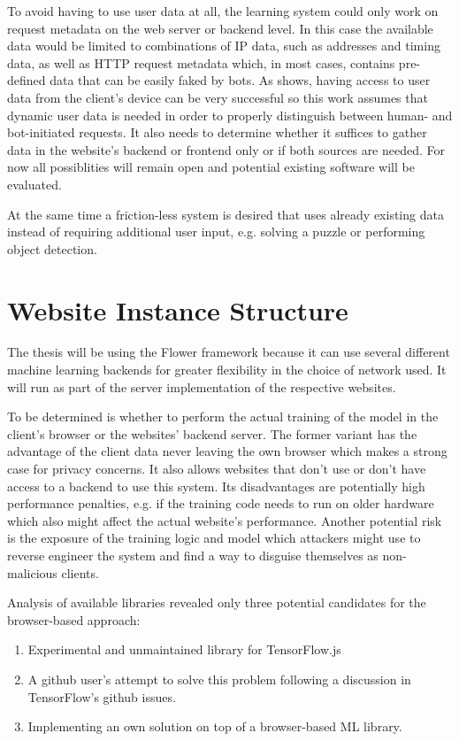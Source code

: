 \documentclass[
    fontsize=12pt,
    headings=small,
    parskip=half,           %
    bibliography=totoc,
    numbers=noenddot,       %
    open=any,               %
    ]{scrreprt}
\begin{document}
To avoid having to use user data at all, the learning system could only work on request metadata on the web server or backend level. In this case the available data would be limited to combinations of IP data, such as addresses and timing data, as well as HTTP request metadata which, in most cases, contains pre-defined data that can be easily faked by bots. As \cite{PETS2021} shows, having access to user data from the client's device can be very successful so this work assumes that dynamic user data is needed in order to properly distinguish between human- and bot-initiated requests. It also needs to determine whether it suffices to gather data in the website's backend or frontend only or if both sources are needed. For now all possiblities will remain open and potential existing software will be evaluated.

At the same time a friction-less system is desired that uses already existing data instead of requiring additional user input, e.g. solving a puzzle or performing object detection.

\section{Website Instance Structure}

The thesis will be using the Flower framework because it can use several different machine learning backends for greater flexibility in the choice of network used. It will run as part of the server implementation of the respective websites.

To be determined is whether to perform the actual training of the model in the client's browser or the websites' backend server. The former variant has the advantage of the client data never leaving the own browser which makes a strong case for privacy concerns. It also allows websites that don't use or don't have access to a backend to use this system. Its disadvantages are potentially high performance penalties, e.g. if the training code needs to run on older hardware which also might affect the actual website's performance. Another potential risk is the exposure of the training logic and model which attackers might use to reverse engineer the system and find a way to disguise themselves as non-malicious clients.

Analysis of available libraries revealed only three potential candidates for the browser-based approach:

\begin{enumerate}
	\item Experimental and unmaintained library for TensorFlow.js \cite{PAIRFL2019}
	\item A github user's attempt \cite{SaFL2019} to solve this problem following a discussion in TensorFlow's github issues.
	\item Implementing an own solution on top of a browser-based ML library.
\end{enumerate}
\end{document}
